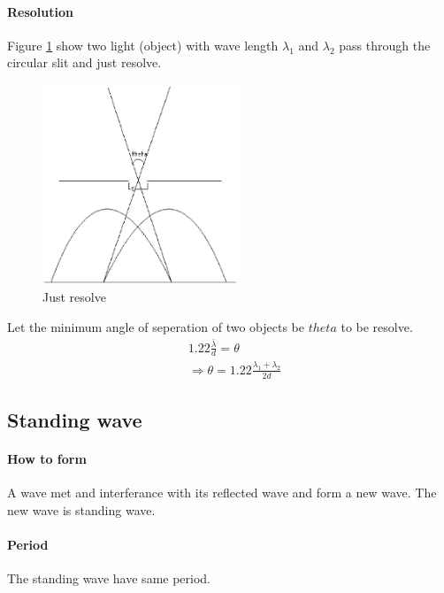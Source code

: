         \paragraph{Resolution}
            Figure \ref{just_resol} show two light (object) with wave length $\lambda_1$ and $\lambda_2$ pass through the circular slit and just resolve.

            \begin{figure}[H]
                \begin{center}
                    \includegraphics[height=6cm]{wave_charts/resol.eps}
                \end{center}
                \caption{Just resolve}
                \label{just_resol}
            \end{figure}

            Let the minimum angle of seperation of two objects be $theta$ to be resolve. 
            \begin{align}
                & 1.22 \frac{\bar{\lambda}}{d} = \theta \\
                & \Rightarrow \theta = 1.22 \frac{\lambda_1 + \lambda_2}{2 d}
            \end{align}

    \subsection{Standing wave}
        \paragraph{How to form}
            A wave met and interferance with its reflected wave and form a new wave. The new wave is standing wave.

        \paragraph{Period}
            The standing wave have same period.

